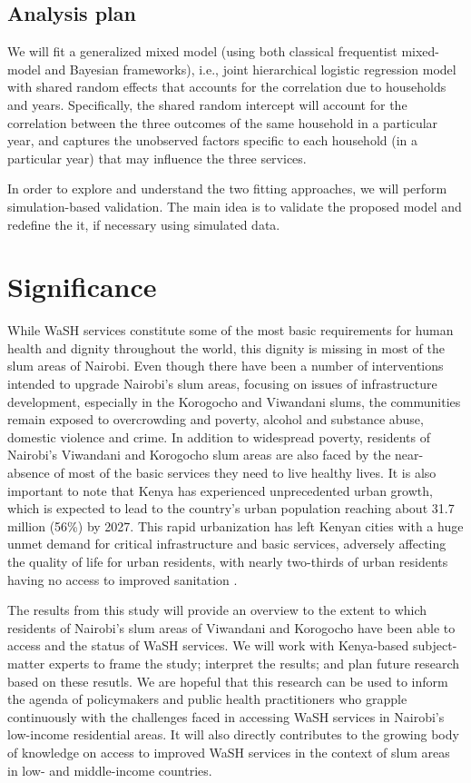 \subsection*{Analysis plan}

We will fit a generalized mixed model (using both classical frequentist mixed-model and Bayesian frameworks), i.e., joint hierarchical logistic regression model with shared random effects that accounts for the correlation due to households and years. Specifically, the shared random intercept will account for the correlation between the three outcomes of the same household in a particular year, and captures the unobserved factors specific to each household (in a particular year) that may influence the three services.

In order to explore and understand the two fitting approaches, we will perform simulation-based validation.  The main idea is to validate the proposed model and redefine the it, if necessary using simulated data.

\section*{Significance}

While WaSH services constitute some of the most basic requirements for human health and dignity throughout the world, this dignity is missing in most of the slum areas of Nairobi. Even though there have been a number of interventions intended to upgrade Nairobi's slum areas, focusing on issues of infrastructure development, especially in the Korogocho and Viwandani slums, the communities remain exposed to overcrowding and poverty, alcohol and substance abuse, domestic violence and crime. In addition to widespread poverty, residents of Nairobi's Viwandani and Korogocho slum areas are also faced by the near-absence of most of the basic services they need to live healthy lives. It is also important to note that Kenya has experienced unprecedented urban growth, which is expected to lead to the country's urban population reaching about 31.7 million (56\%) by 2027. This rapid urbanization has left Kenyan cities with a huge unmet demand for critical infrastructure and basic services, adversely affecting the quality of life for urban residents, with nearly two-thirds of urban residents having no access to improved sanitation \citep{chikozho2019leaving}. 

The results from this study will provide an overview to the extent to which residents of Nairobi's slum areas of Viwandani and Korogocho have been able to access and the status of WaSH services. We will work with Kenya-based subject-matter experts to frame the study; interpret the results; and plan future research based on these resutls. We are hopeful that this research can be used to inform the agenda of policymakers and public health practitioners who grapple continuously with the challenges faced in accessing WaSH services in Nairobi's low-income residential areas. It will also directly contributes to the growing body of knowledge on access to improved WaSH services in the context of slum areas in low- and middle-income countries.

